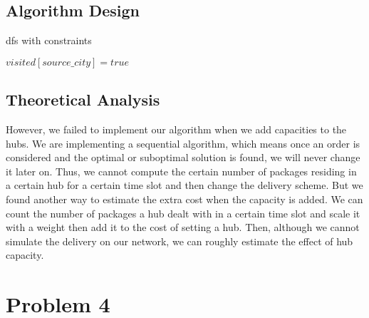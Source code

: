 \documentclass{llncs}
\begin{document}
\subsection{Algorithm Design}
\begin{algorithm}
  \BlankLine
  \caption{dfs with constraints}
  \label{Alg-dfs-with-constraints}
  
  \BlankLine 
  
  $visited[source\_city] = true$\;

\end{algorithm}
\subsection{Theoretical Analysis}
However, we failed to implement our algorithm when we add capacities to the hubs. We are implementing a sequential algorithm, which means once an order is considered and the optimal or suboptimal solution is found, we will never change it later on. Thus, we cannot compute the certain number of packages residing in a certain hub for a certain time slot and then change the delivery scheme. But we found another way to estimate the extra cost when the capacity is added. We can count the number of packages a hub dealt with in a certain time slot and scale it with a weight then add it to the cost of setting a hub. Then, although we cannot simulate the delivery on our network, we can roughly estimate the effect of hub capacity.
\section{Problem 4}
\end{document}

